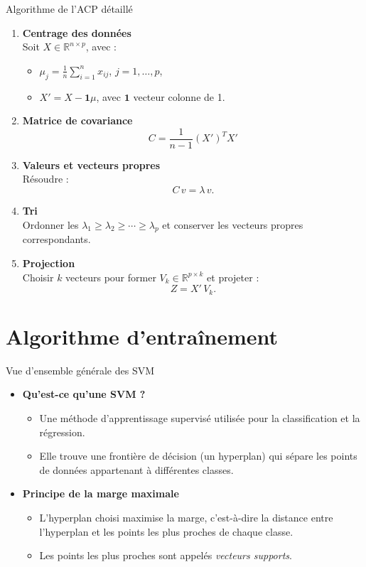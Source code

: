 \documentclass{beamer}
\begin{document}
\begin{frame}{Algorithme de l'ACP détaillé}
\footnotesize
\begin{enumerate}
    \item \textbf{Centrage des données} \\
    Soit $X\in\mathbb{R}^{n\times p}$, avec :
    \begin{itemize}
        \item $\mu_j=\frac{1}{n}\sum_{i=1}^{n}x_{ij}$, $j=1,\dots,p$,
        \item $X'=X-\mathbf{1}\mu$, avec $\mathbf{1}$ vecteur colonne de 1.
    \end{itemize}
    \item \textbf{Matrice de covariance} \\
    \[
    C=\frac{1}{n-1}(X')^T X'
    \]
    \item \textbf{Valeurs et vecteurs propres} \\
    Résoudre :
    \[
    C\,v=\lambda\,v.
    \]
    \item \textbf{Tri} \\
    Ordonner les $\lambda_1\ge\lambda_2\ge\cdots\ge\lambda_p$ et conserver les vecteurs propres correspondants.
    \item \textbf{Projection} \\
    Choisir $k$ vecteurs pour former $V_k\in\mathbb{R}^{p\times k}$ et projeter :
    \[
    Z=X'\,V_k.
    \]
\end{enumerate}
\end{frame}

\section{Algorithme d'entraînement}
\begin{frame}{Vue d'ensemble générale des SVM}
    \begin{itemize}
        \item \textbf{Qu'est-ce qu'une SVM ?}
        \begin{itemize}
            \item Une méthode d'apprentissage supervisé utilisée pour la classification et la régression.
            \item Elle trouve une frontière de décision (un hyperplan) qui sépare les points de données appartenant à différentes classes.
        \end{itemize}
        \item \textbf{Principe de la marge maximale}
        \begin{itemize}
            \item L'hyperplan choisi maximise la marge, c'est-à-dire la distance entre l'hyperplan et les points les plus proches de chaque classe.
            \item Les points les plus proches sont appelés \emph{vecteurs supports}.
        \end{itemize}\
    \end{itemize}
\end{frame}
\end{document}
